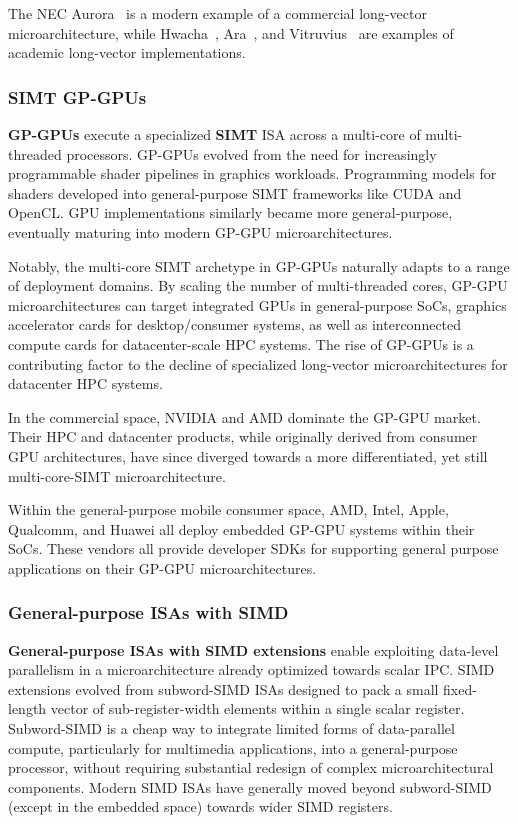 The NEC Aurora~\cite{nec_aurora} is a modern example of a commercial long-vector microarchitecture, while Hwacha~\cite{hwacha_manual}, Ara~\cite{ara2}, and Vitruvius~\cite{minervini_vitruvius_2023} are examples of academic long-vector implementations.

\subsubsection{SIMT GP-GPUs}

\textbf{GP-GPUs} execute a specialized \textbf{SIMT} ISA across a multi-core of multi-threaded processors.
GP-GPUs evolved from the need for increasingly programmable shader pipelines in graphics workloads.
Programming models for shaders developed into general-purpose SIMT frameworks like CUDA and OpenCL.
GPU implementations similarly became more general-purpose, eventually maturing into modern GP-GPU microarchitectures.

Notably, the multi-core SIMT archetype in GP-GPUs naturally adapts to a range of deployment domains.
By scaling the number of multi-threaded cores, GP-GPU microarchitectures can target integrated GPUs in general-purpose SoCs, graphics accelerator cards for desktop/consumer systems, as well as interconnected compute cards for datacenter-scale HPC systems.
The rise of GP-GPUs is a contributing factor to the decline of specialized long-vector microarchitectures for datacenter HPC systems.

In the commercial space, NVIDIA and AMD dominate the GP-GPU market.
Their HPC and datacenter products, while originally derived from consumer GPU architectures, have since diverged towards a more differentiated, yet still multi-core-SIMT microarchitecture.

Within the general-purpose mobile consumer space, AMD, Intel, Apple, Qualcomm, and Huawei all deploy embedded GP-GPU systems within their SoCs.
These vendors all provide developer SDKs for supporting general purpose applications on their GP-GPU microarchitectures.


\subsubsection{General-purpose ISAs with SIMD}

\textbf{General-purpose ISAs with SIMD extensions} enable exploiting data-level parallelism in a microarchitecture already optimized towards scalar IPC.
SIMD extensions evolved from subword-SIMD ISAs designed to pack a small fixed-length vector of sub-register-width elements within a single scalar register.
Subword-SIMD is a cheap way to integrate limited forms of data-parallel compute, particularly for multimedia applications, into a general-purpose processor, without requiring substantial redesign of complex microarchitectural components.
Modern SIMD ISAs have generally moved beyond subword-SIMD (except in the embedded space) towards wider SIMD registers.

